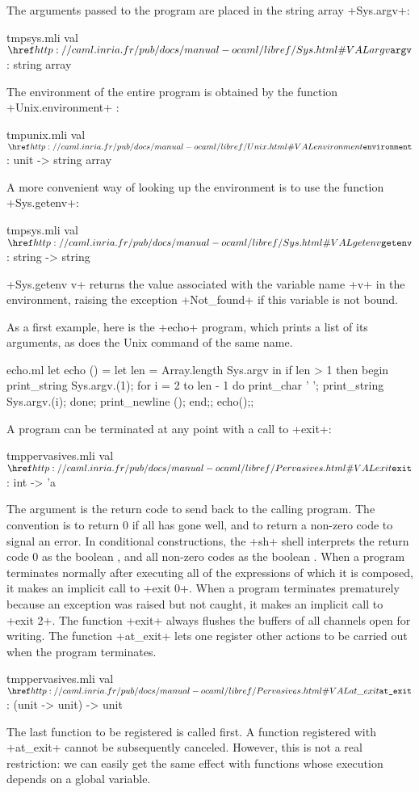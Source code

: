 The arguments passed to the program are placed in the string array
\ml+Sys.argv+:
%
\begin{listingcodefile}{tmpsys.mli}
val $\indexlibvalue{Sys}{argv}$ : string array
\end{listingcodefile}
%
The environment of the entire program is obtained by the function
\ml+Unix.environment+ :
%
\begin{listingcodefile}{tmpunix.mli}
val $\indexlibvalue{Unix}{environment}$ : unit -> string array
\end{listingcodefile}
%
A more convenient way of looking up the environment is to use the
function \ml+Sys.getenv+:
%
\begin{listingcodefile}{tmpsys.mli}
val $\indexlibvalue{Sys}{getenv}$ : string -> string
\end{listingcodefile}
%
\ml+Sys.getenv v+ returns the value associated with the variable name
\ml+v+ in 
the environment, raising the exception  \ml+Not_found+ if this 
variable is not bound.
%
\begin{example}
As a first example, here is the \ml+echo+ program, which prints a
list of its arguments, as does the Unix command of the same name.
\begin{listingcodefile}{echo.ml}
let echo () = 
  let len = Array.length Sys.argv in
  if len > 1 then 
    begin
      print_string Sys.argv.(1); 
      for i = 2 to len - 1 do 
        print_char ' ';
        print_string Sys.argv.(i); 
      done;
      print_newline ();
    end;;
echo();;
\end{listingcodefile}
\end{example}

A program can be terminated at any point with a call to \ml+exit+:
%
\begin{listingcodefile}{tmppervasives.mli}
val $\indexlibvalue{Pervasives}{exit}$ : int -> 'a
\end{listingcodefile}
%
The argument is the return code to send back to the calling program. The
convention is to return 0 if all has gone well, and to return a
non-zero code to signal an error. In conditional constructions, the
\ml+sh+ shell interprets the return code 0 as the boolean
, and all non-zero codes as the boolean .
%
When a program terminates normally after executing all of the
expressions of which it is composed, it makes an implicit call to
\ml+exit 0+. When a program terminates prematurely because an
exception was raised but not caught, it makes an implicit call to
\ml+exit 2+.
%
The function \ml+exit+ always flushes the buffers of all channels open for
writing. The function \ml+at_exit+ lets one register other actions
to be carried out when the program terminates.
%
\begin{listingcodefile}{tmppervasives.mli}
val $\indexlibvalue{Pervasives}{at\_exit}$ : (unit -> unit) -> unit
\end{listingcodefile}
%
The last function to be registered is called first. A function registered with
\ml+at_exit+ cannot be subsequently canceled. However, this is not a
real restriction: we can easily get the same effect with functions
whose execution depends on a global variable.

